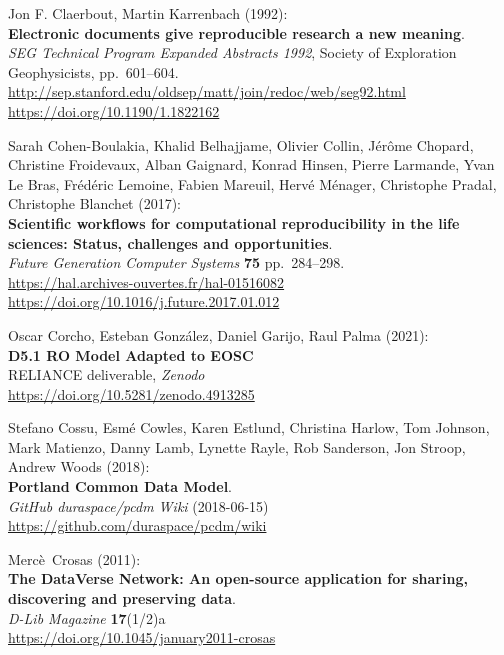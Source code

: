 \begin{thebibliography}{9}
Jon F. Claerbout, Martin Karrenbach (1992):\\
\textbf{Electronic documents give reproducible research a new
meaning}.\\
\emph{SEG Technical Program Expanded Abstracts 1992}, Society of
Exploration Geophysicists, pp.~601--604.\\
\url{http://sep.stanford.edu/oldsep/matt/join/redoc/web/seg92.html}\\
\url{https://doi.org/10.1190/1.1822162}

Sarah Cohen-Boulakia, Khalid Belhajjame, Olivier Collin, Jérôme
Chopard, Christine Froidevaux, Alban Gaignard, Konrad Hinsen, Pierre
Larmande, Yvan Le Bras, Frédéric Lemoine, Fabien Mareuil, Hervé Ménager,
Christophe Pradal, Christophe Blanchet (2017):\\
\textbf{Scientific workflows for computational reproducibility in the
life sciences: Status, challenges and opportunities}.\\
\emph{Future Generation Computer Systems} \textbf{75} pp.~284--298.\\
\url{https://hal.archives-ouvertes.fr/hal-01516082}\\
\url{https://doi.org/10.1016/j.future.2017.01.012}

Oscar Corcho, Esteban González, Daniel Garijo, Raul Palma (2021):\\
\textbf{D5.1 RO Model Adapted to EOSC}\\
RELIANCE deliverable, \emph{Zenodo}\\
\url{https://doi.org/10.5281/zenodo.4913285}

Stefano Cossu, Esmé Cowles, Karen Estlund, Christina Harlow,
Tom Johnson, Mark Matienzo, Danny Lamb, Lynette Rayle, Rob Sanderson,
Jon Stroop, Andrew Woods (2018):\\
\textbf{Portland Common Data Model}.\\
\emph{GitHub duraspace/pcdm Wiki} (2018-06-15)\\
\url{https://github.com/duraspace/pcdm/wiki}

Mercè~Crosas (2011):\\
\textbf{The DataVerse Network: An open-source application for sharing,
discovering and preserving data}.\\
\emph{D-Lib Magazine} \textbf{17}(1/2)a\\
\url{https://doi.org/10.1045/january2011-crosas}


\end{thebibliography}
